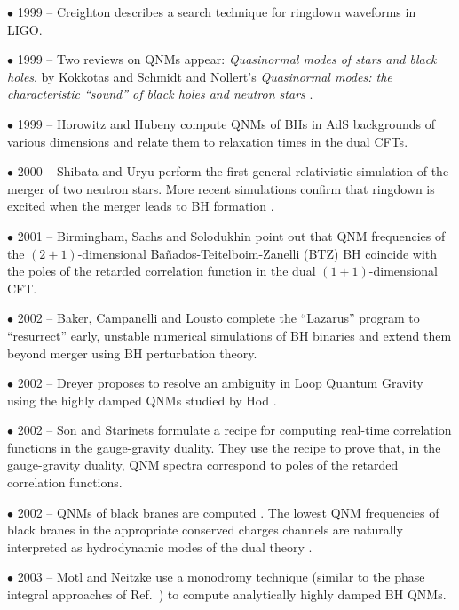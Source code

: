 \documentclass[]{iopart}
\begin{document}
\noindent $\bullet$ 1999 -- Creighton \cite{Creighton:1999pm} describes a
search technique for ringdown waveforms in LIGO.

\noindent $\bullet$ 1999 -- Two reviews on QNMs appear: {\it Quasinormal modes
  of stars and black holes}, by Kokkotas and Schmidt \cite{Kokkotas:1999bd}
and Nollert's {\it Quasinormal modes: the characteristic ``sound'' of black
  holes and neutron stars} \cite{Nollert:1999ji}.

\noindent $\bullet$ 1999 -- Horowitz and Hubeny \cite{Horowitz:1999jd} compute
QNMs of BHs in AdS backgrounds of various dimensions and relate them to
relaxation times in the dual CFTs.

\noindent $\bullet$ 2000 -- Shibata and Uryu \cite{Shibata:1999wm} perform the
first general relativistic simulation of the merger of two neutron stars. More
recent simulations confirm that ringdown is excited when the merger leads to
BH formation \cite{Baiotti:2008ra}.

\noindent $\bullet$ 2001 -- Birmingham, Sachs and Solodukhin
\cite{Birmingham:2001pj} point out that QNM frequencies of the
$(2+1)$-dimensional Ba\~nados-Teitelboim-Zanelli (BTZ) BH
\cite{Cardoso:2001hn} coincide with the poles of the retarded correlation
function in the dual $(1+1)$-dimensional CFT.

\noindent $\bullet$ 2002 -- Baker, Campanelli and Lousto \cite{Baker:2001sf}
complete the ``Lazarus'' program to ``resurrect'' early, unstable numerical
simulations of BH binaries and extend them beyond merger using BH perturbation
theory.

\noindent $\bullet$ 2002 -- Dreyer \cite{Dreyer:2002vy} proposes to resolve an
ambiguity in Loop Quantum Gravity using the highly damped QNMs studied by Hod
\cite{Hod:1998vk}.

\noindent $\bullet$ 2002 -- Son and Starinets \cite{Son:2002sd} formulate a
recipe for computing real-time correlation functions in the gauge-gravity
duality.  They use the recipe to prove that, in the gauge-gravity duality, QNM
spectra correspond to poles of the retarded correlation functions.

\noindent $\bullet$ 2002 -- QNMs of black branes are computed
\cite{Starinets:2002br}. The lowest QNM frequencies of black branes in the
appropriate conserved charges channels are naturally interpreted as
hydrodynamic modes of the dual theory \cite{Nunez:2003eq}.

\noindent $\bullet$ 2003 -- Motl and Neitzke \cite{Motl:2003cd} use a monodromy
technique (similar to the phase integral approaches of
Ref.~\cite{Froeman:1992gp}) to compute analytically highly damped BH QNMs.
\end{document}

